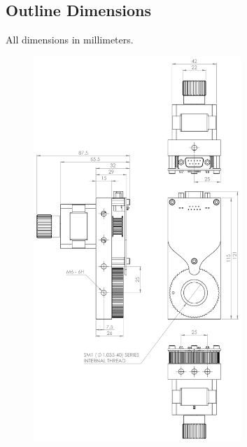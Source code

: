 \documentclass[a4paper, final, 12pt, oneside]{scrartcl}
\numberwithin{equation}{section}
\numberwithin{table}{section}
\numberwithin{figure}{section}
\begin{document}
\subsection*{Outline Dimensions}
All dimensions in millimeters.
\begin{figure}[!htp]
  \centering
  \includegraphics[angle=0,origin=c,width=0.7\textwidth]{./drawings/M101_outline_dimensions.pdf}
\end{figure}
\FloatBarrier
\end{document}
